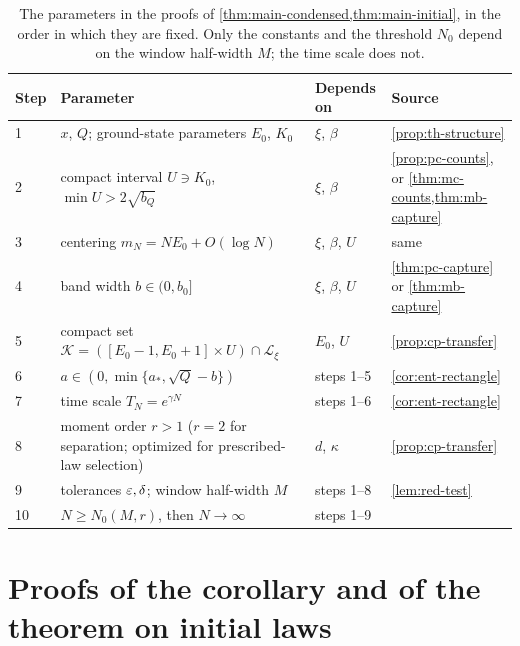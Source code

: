 \begin{table}[ht]
\centering
\small
\begin{tabular}{@{}l>{\raggedright\arraybackslash}p{}>{\raggedright\arraybackslash}p{}>{\raggedright\arraybackslash}p{}@{}}
\toprule
Step & Parameter & Depends on & Source\\
\midrule
1 & $x$, $Q$; ground-state parameters $E_0$, $K_0$ & $\xi$, $\beta$ & \cref{prop:th-structure}\\
2 & compact interval $U\ni K_0$, $\min U>2\sqrt{b_Q}$ & $\xi$, $\beta$ & \cref{prop:pc-counts}, or \cref{thm:mc-counts,thm:mb-capture}\\
3 & centering $m_N=NE_0+O(\log N)$ & $\xi$, $\beta$, $U$ & same\\
4 & band width $b\in(0,b_0]$ & $\xi$, $\beta$, $U$ & \cref{thm:pc-capture} or \cref{thm:mb-capture}\\
5 & compact set $\mathcal K=([E_0-1,E_0+1]\times U)\cap\mathcal L_\xi$ & $E_0$, $U$ & \cref{prop:cp-transfer}\\
6 & $a\in(0,\min\{a_*,\sqrt Q-b\})$ & steps 1--5 & \cref{cor:ent-rectangle}\\
7 & time scale $T_N=e^{\gamma N}$ & steps 1--6 & \cref{cor:ent-rectangle}\\
8 & moment order $r>1$ ($r=2$ for separation; optimized for prescribed-law selection) & $d$, $\kappa$ & \cref{prop:cp-transfer}\\
9 & tolerances $\varepsilon,\delta$; window half-width $M$ & steps 1--8 & \cref{lem:red-test}\\
10 & $N\ge N_0(M,r)$, then $N\to\infty$ & steps 1--9 & \\
\bottomrule
\end{tabular}
\caption{The parameters in the proofs of \cref{thm:main-condensed,thm:main-initial}, in the order in which they are fixed. Only the constants and the threshold $N_0$ depend on the window half-width $M$; the time scale does not.}
\label{tab:cp-parameters}
\end{table}

\section{Proofs of the corollary and of the theorem on initial laws}\label{sec:cp-initial}

